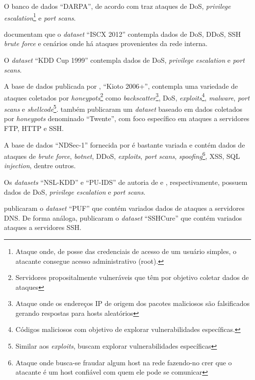 O banco de dados ``DARPA'', de acordo com  traz ataques de DoS, \textit{privilege escalation}\footnote{Ataque onde, de posse das credenciais de acesso de um usuário simples, o atacante consegue acesso administrativo (root).} e \textit{port scans}.

 documentam que o \textit{dataset} ``ISCX 2012'' contempla dados de DoS, DDoS, SSH \textit{brute force} e cenários onde há ataques provenientes da rede interna.

O \textit{dataset} ``KDD Cup 1999''  contempla dados de DoS, \textit{privilege escalation} e \textit{port scans}.

A base de dados publicada por , ``Kioto 2006+'', contempla uma variedade de ataques coletados por \textit{honeypots}\footnote{Servidores propositalmente vulneráveis que têm por objetivo coletar dados de ataques} como \textit{backscatter}\footnote{Ataque onde os endereços IP de origem dos pacotes maliciosos são falsificados gerando respostas para hosts aleatórios}, DoS, \textit{exploits}\footnote{Códigos maliciosos com objetivo de explorar vulnerabilidades específicas.}, \textit{malware}, \textit{port scans} e \textit{shellcode}\footnote{Similar aos \textit{exploits}, buscam explorar vulnerabilidades específicas}.  também publicaram um \textit{dataset} baseado em dados coletados por \textit{honeypots} denominado ``Twente'', com foco específico em ataques a servidores FTP, HTTP e SSH.

A base de dados ``NDSec-1'' fornecida por  é bastante variada e contém dados de ataques de \textit{brute force}, \textit{botnet}, DDoS, \textit{exploits}, \textit{port scans}, \textit{spoofing}\footnote{Ataque onde busca-se fraudar algum host na rede fazendo-no crer que o atacante é um host confiável com quem ele pode se comunicar}, XSS, SQL \textit{injection}, dentre outros.

Os \textit{datasets} ``NSL-KDD'' e ``PU-IDS'' de autoria de  e , respectivamente, possuem dados de DoS, \textit{privilege escalation} e \textit{port scans}.

 publicaram o \textit{dataset} ``PUF'' que contém variados dados de ataques a servidores DNS. De forma análoga,  publicaram o \textit{dataset} ``SSHCure'' que contém variados ataques a servidores SSH.

